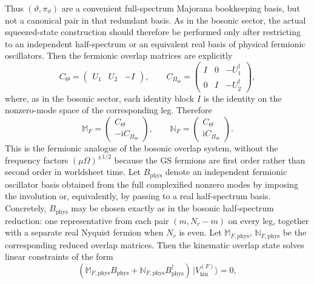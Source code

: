 \documentclass[11pt]{article}
\numberwithin{equation}{section}
\begin{document}
Thus $(\vartheta,\pi_\vartheta)$ are a convenient full-spectrum Majorana bookkeeping basis, but not a canonical pair in that redundant basis. As in the bosonic sector, the actual squeezed-state construction should therefore be performed only after restricting to an independent half-spectrum or an equivalent real basis of physical fermionic oscillators.
Then the fermionic overlap matrices are explicitly
\begin{equation}
\label{eq:s13-008}
C_{\Theta}=
\begin{pmatrix}
U_1 & U_2 & -I
\end{pmatrix},
\qquad
C_{\Pi_{\Theta}}=
\begin{pmatrix}
I & 0 & -U_1^\dagger\\
0 & I & -U_2^\dagger
\end{pmatrix},
\end{equation}
where, as in the bosonic sector, each identity block $I$ is the identity on the nonzero-mode space of the corresponding leg. Therefore
\begin{equation}
\label{eq:s13-009}
\mathbb M_F=
\begin{pmatrix}
C_{\Theta}\\
-\mathrm{i}C_{\Pi_{\Theta}}
\end{pmatrix},
\qquad
\mathbb N_F=
\begin{pmatrix}
C_{\Theta}\\
\mathrm{i}C_{\Pi_{\Theta}}
\end{pmatrix}.
\end{equation}
This is the fermionic analogue of the bosonic overlap system, without the frequency factors $(\mu\Omega)^{\pm1/2}$ because the GS fermions are first order rather than second order in worldsheet time. Let $B_{\mathrm{phys}}$ denote an independent fermionic oscillator basis obtained from the full complexified nonzero modes by imposing the involution or, equivalently, by passing to a real half-spectrum basis. Concretely, $B_{\mathrm{phys}}$ may be chosen exactly as in the bosonic half-spectrum reduction: one representative from each pair $(m,N_r-m)$ on every leg, together with a separate real Nyquist fermion when $N_r$ is even. Let $\mathbb M_{F,\mathrm{phys}}$, $\mathbb N_{F,\mathrm{phys}}$ be the corresponding reduced overlap matrices. Then the kinematic overlap state solves linear constraints of the form
\begin{equation}
\label{eq:s13-010}
(\mathbb M_{F,\mathrm{phys}} B_{\mathrm{phys}} + \mathbb N_{F,\mathrm{phys}} B_{\mathrm{phys}}^\dagger)\,|V^{(F)}_{\mathrm{kin}}\rangle = 0,
\end{equation}
\end{document}
